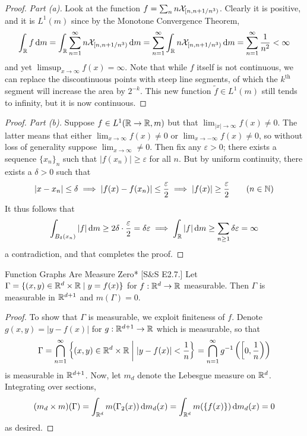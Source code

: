\begin{proof}
    \emph{Part (a).} Look at the function \(f = \sum_{n} n \mathcal{X}_{[n, n+1/n^3)}\). Clearly it is positive, and it is \(L^1(m)\) since by the Monotone Convergence Theorem, 
    \[
        \int_{\mathbb{R}} f \, \mathrm{d}m
        = \int_{\mathbb{R}} \sum_{n=1}^\infty n \mathcal{X}_{[n, n + 1/n^3)} \, \mathrm{d}m
        = \sum_{n=1}^\infty \int_{\mathbb{R}} n \mathcal{X}_{[n, n + 1/n^3)} \, \mathrm{d}m
        = \sum_{n=1}^\infty \frac{1}{n^2}
        < \infty
    \]
    and yet \(\limsup_{x \to \infty} f(x) = \infty\). Note that while \(f\) itself is not continuous, we can replace the discontinuous points with steep line segments, of which the \(k^{\text{th}}\) segment will increase the area by \(2^{-k}\). This new function \(\tilde{f} \in L^1(m)\) still tends to infinity, but it is now continuous. 
\end{proof}

\begin{proof}
    \emph{Part (b).} Suppose \(f \in L^1(\mathbb{R} \to \mathbb{R}, m)\) but that \(\lim_{|x| \to \infty} f(x) \neq 0\). The latter means that either \(\lim_{x \to \infty} f(x) \neq 0\) or \(\lim_{x \to -\infty} f(x) \neq 0\), so without loss of generality suppose \(\lim_{x \to \infty} \neq 0\). Then fix any \(\varepsilon > 0\); there exists a sequence \(\{x_n\}_n\) such that \(|f(x_n)| \geq \varepsilon\) for all \(n\). But by uniform continuity, there exists a \(\delta > 0\) such that 
    \[
        |x - x_n| \leq \delta \implies |f(x) - f(x_n)| \leq \frac{\varepsilon}{2} \implies |f(x)| \geq \frac{\varepsilon}{2}
        \qquad (n \in \mathbb{N})
    \]
    It thus follows that 
    \[
    \int_{B_{\delta}(x_n)} |f| \, \mathrm{d}m \geq 2\delta \cdot \frac{\varepsilon}{2} = \delta \varepsilon
    \implies \int_{\mathbb{R}} |f| \, \mathrm{d}m \geq \sum_{n \geq 1} \delta \varepsilon = \infty
    \]
    a contradiction, and that completes the proof. 
\end{proof}

\begin{problem}{Function Graphs Are Measure Zero}*
    [S\&S E2.7.] Let \(\Gamma = \{(x, y) \in \mathbb{R}^d \times \mathbb{R} \mid y = f(x) \}\) for \(f : \mathbb{R}^d \to \mathbb{R}\) measurable. Then \(\Gamma\) is measurable in \(\mathbb{R}^{d+1}\) and \(m(\Gamma) = 0\).
\end{problem}

\begin{proof}
    To show that \(\Gamma\) is measurable, we exploit finiteness of \(f\). Denote \(g(x, y) = |y - f(x)|\) for \(g : \mathbb{R}^{d+1} \to \mathbb{R}\) which is measurable, so that
    \[
        \Gamma 
        = \bigcap_{n=1}^\infty \left\{ (x, y) \in \mathbb{R}^d \times \mathbb{R} \;\biggr\rvert\; |y - f(x)| < \frac{1}{n} \right\}
        = \bigcap_{n=1}^\infty g^{-1}\left(\left[0, \frac{1}{n}\right)\right)
    \]
    is measurable in \(\mathbb{R}^{d+1}\). Now, let \(m_d\) denote the Lebesgue measure on \(\mathbb{R}^d\). Integrating over sections, 
    \[
        (m_d \times m)(\Gamma)
        = \int_{\mathbb{R}^d} m(\Gamma_2(x)) \, \mathrm{d}m_d(x)
        = \int_{\mathbb{R}^d} m(\{f(x)\}) \, \mathrm{d}m_d(x)
        = 0
    \]
    as desired. 
\end{proof}


